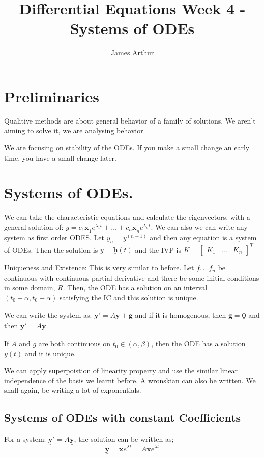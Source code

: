 \documentclass{article}
\title{Differential Equations Week 4 - Systems of ODEs}
\author{James Arthur}
\renewcommand{\vec}[1]{\underline{\textbf{#1}}}
\renewcommand{\l}{\lambda}
\begin{document}
\maketitle
\tableofcontents\newpage


\section{Preliminaries}
Qualitive methods are about general behavior of a family of solutions. We aren't aiming to solve it, we are analysing behavior.

We are focusing on stability of the ODEs. If you make a small change an early time, you have a small change later.\\

\section{Systems of ODEs.}

We can take the characteristic equations and calculate the eigenvectors. with a general solution of: $\displaystyle{y = c_1\vec x_1 e^{\l_1 t }+ \dots + c_n\vec x_n e^{\l_n t} }$. We can also we can write any system as first order ODES. Let $y_n = y^(n-1)$ and then any equation is a system of ODEs. Then the solution is $y = \vec h (t)$ and the IVP is $K = \begin{bmatrix}
  K_1 & \dots & K_n
\end{bmatrix}^T$

Uniqueness and Existence: This is very similar to before. Let $f_1 \dots f_n$ be continuous with continuous partial derivative and there be some initial conditions in some domain, $R$. Then, the ODE has a solution on an interval $(t_0 - \alpha, t_0 + \alpha)$ satisfying the IC and this solution is unique.

We can write the system as: $\displaystyle{\vec y' = A\vec y + \vec g}$ and if it is homogenous, then $\displaystyle{\vec g = \vec 0}$ and then $\displaystyle{\vec y' = A\vec y}$.

If $A$ and $g$ are both continuous on $t_0 \in(\alpha, \beta)$, then the ODE has a solution $y(t)$ and it is unique.

We can apply superpoistion of linearity property and use the similar linear independence of the basis we learnt before. A wronskian can also be written. We shall again, be writing a lot of exponentials.

\subsection{Systems of ODEs with constant Coefficients}
For a system: $\displaystyle{\vec y' = A\vec y}$, the solution can be written as;
$${\vec y =\vec x e^{\l t} = A\vec x e^{\l t}}$$
\end{document}
